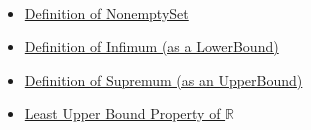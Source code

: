 \begin{remark*}[Dependencies]~\\
\begin{itemize}
  \item \hyperref[pred:nonempty-set]{Definition of NonemptySet}
  \item \hyperref[pred:infimum]{Definition of Infimum (as a LowerBound)}
  \item \hyperref[pred:supremum]{Definition of Supremum (as an UpperBound)}
  \item \hyperref[pred:least-upper-bound-property]{Least Upper Bound Property of $\mathbb{R}$}
\end{itemize}
\end{remark*}